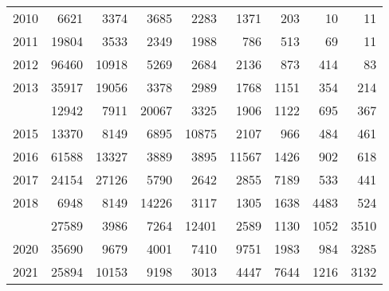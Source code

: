 \documentclass[
]{article}
\begin{document}
\begin{longtable}[t]{lrrrrrrrr}
2010 & 6621 & 3374 & 3685 & 2283 & 1371 & 203 & 10 & 11\\
2011 & 19804 & 3533 & 2349 & 1988 & 786 & 513 & 69 & 11\\
2012 & 96460 & 10918 & 5269 & 2684 & 2136 & 873 & 414 & 83\\
2013 & 35917 & 19056 & 3378 & 2989 & 1768 & 1151 & 354 & 214\\
\addlinespace
2014 & 12942 & 7911 & 20067 & 3325 & 1906 & 1122 & 695 & 367\\
2015 & 13370 & 8149 & 6895 & 10875 & 2107 & 966 & 484 & 461\\
2016 & 61588 & 13327 & 3889 & 3895 & 11567 & 1426 & 902 & 618\\
2017 & 24154 & 27126 & 5790 & 2642 & 2855 & 7189 & 533 & 441\\
2018 & 6948 & 8149 & 14226 & 3117 & 1305 & 1638 & 4483 & 524\\
\addlinespace
2019 & 27589 & 3986 & 7264 & 12401 & 2589 & 1130 & 1052 & 3510\\
2020 & 35690 & 9679 & 4001 & 7410 & 9751 & 1983 & 984 & 3285\\
2021 & 25894 & 10153 & 9198 & 3013 & 4447 & 7644 & 1216 & 3132\\*
\end{longtable}
\end{document}
